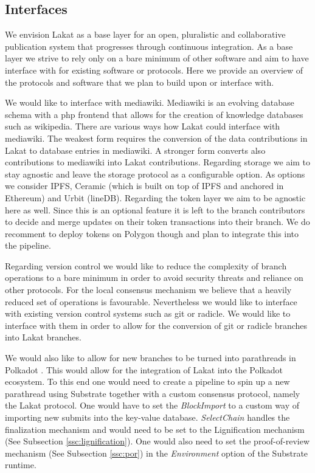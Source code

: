 \documentclass[14pt]{article}
\begin{document}
\subsection{Interfaces}
\label{ssc:interfaces}

We envision Lakat as a base layer for an open, pluralistic and collaborative publication system that progresses through continuous integration. As a base layer we strive to rely only on a bare minimum of other software and aim to have interface with for existing software or protocols. Here we provide an overview of the protocols and software that we plan to build upon or interface with.

We would like to interface with mediawiki. Mediawiki is an evolving database schema with a php frontend that allows for the creation of knowledge databases such as wikipedia. There are various ways how Lakat could interface with mediawiki. The weakest form requires the conversion of the data contributions in Lakat to database entries in mediawiki. A stronger form converts also contributions to mediawiki into Lakat contributions. Regarding storage we aim to stay agnostic and leave the storage protocol as a configurable option. As options we consider IPFS, Ceramic (which is built on top of IPFS and anchored in Ethereum) and Urbit (lineDB). Regarding the token layer we aim to be agnostic here as well. Since this is an optional feature it is left to the branch contributors to decide and merge updates on their token transactions into their branch. We do recomment to deploy tokens on Polygon though and plan to integrate this into the pipeline.

Regarding version control we would like to reduce the complexity of branch operations to a bare minimum in order to avoid security threats and reliance on other protocols. For the local consensus mechanism we believe that a heavily reduced set of operations is favourable. Nevertheless we would like to interface with existing version control systems such as git or radicle. We would like to interface with them in order to allow for the conversion of git or radicle branches into Lakat branches.

We would also like to allow for new branches to be turned into parathreads in Polkadot \cite{wood2016polkadot}. This would allow for the integration of Lakat into the Polkadot ecosystem. To this end one would need to create a pipeline to spin up a new parathread using Substrate together with a custom consensus protocol, namely the Lakat protocol. One would have to set the \textit{BlockImport} to a custom way of importing new submits into the key-value database. \textit{SelectChain} handles the finalization mechanism and would need to be set to the Lignification mechanism (See Subsection \ref{ssc:lignification}). One would also need to set the proof-of-review mechanism (See Subsection \ref{ssc:por}) in the \textit{Environment} option of the Substrate runtime.
\end{document}
